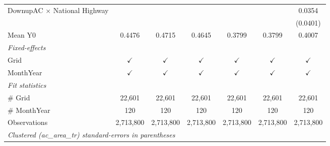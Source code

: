 \begin{table}[htbp]
\begin{tabular}{lcccccc}
      DownupAC $\times$ National Highway                         &               &               &               &               &               & 0.0354\\   
                                                                 &               &               &               &               &               & (0.0401)\\   
      \hline Mean Y0                                             & 0.4476        & 0.4715        & 0.4645        & 0.3799        & 0.3799        & 0.4007\\  
      \midrule
      \emph{Fixed-effects}\\
      Grid                                                       & $\checkmark$  & $\checkmark$  & $\checkmark$  & $\checkmark$  & $\checkmark$  & $\checkmark$\\   
      MonthYear                                                  & $\checkmark$  & $\checkmark$  & $\checkmark$  & $\checkmark$  & $\checkmark$  & $\checkmark$\\   
      \midrule
      \emph{Fit statistics}\\
      \# Grid                                                    & 22,601        & 22,601        & 22,601        & 22,601        & 22,601        & 22,601\\  
      \# MonthYear                                               & 120           & 120           & 120           & 120           & 120           & 120\\  
      Observations                                               & 2,713,800     & 2,713,800     & 2,713,800     & 2,713,800     & 2,713,800     & 2,713,800\\  
      \midrule \midrule
      \multicolumn{7}{l}{\emph{Clustered (ac\_area\_tr) standard-errors in parentheses}}\\
   \end{tabular}
\end{table}


